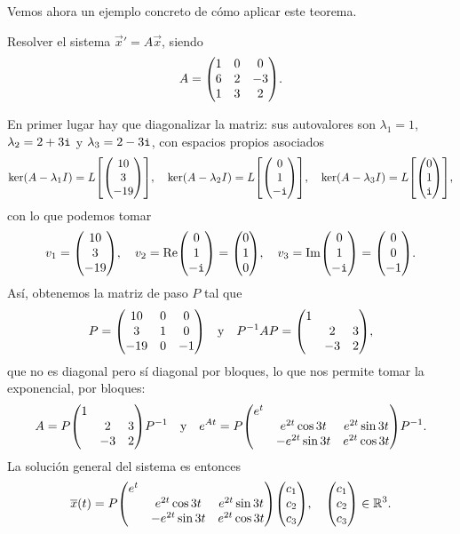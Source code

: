 \documentclass[../ecuaciones_diferenciales.tex]{subfiles}
\begin{document}
Vemos ahora un ejemplo concreto de cómo aplicar este teorema.

\begin{example}
	Resolver el sistema \(\vec{x}' = A\vec{x}\), siendo
	\[A = \mat{1 & 0 & 0 \\ 6 & 2 & -3 \\ 1 & 3 & 2}.\]
\end{example}

\begin{solution}
	En primer lugar hay que diagonalizar la matriz: sus autovalores son
	\(\lambda_1 = 1\), \(\lambda_2 = 2 + 3\mathtt{i}\) y \(\lambda_3 = 2 - 3\mathtt{i}\), 
	con espacios propios asociados
	\[\ker(A - \lambda_1 I) = L \left[ \mat{10 \\ 3 \\ -19} \right], \quad
		\ker(A - \lambda_2 I) = L \left[ \mat{0 \\ 1 \\ -\iu} \right], \quad
		\ker(A - \lambda_3 I) = L \left[\mat{0 \\ 1 \\ \iu} \right],\]
	con lo que podemos tomar
	\[v_1 = \mat{10 \\ 3 \\ -19}, 
		\quad 
		v_2 = \Re\mat{0 \\ 1 \\ -\iu} 
		= \mat{0 \\ 1 \\ 0}, 
		\quad 
		v_3 = \Im\mat{0 \\ 1 \\ -\iu} = \mat{0 \\ 0 \\ -1}.\]
	Así, obtenemos la matriz de paso \(P\) tal que
	\[P = \mat{10 & 0 & 0 \\ 3 & 1 & 0 \\ -19 & 0 & -1}
		\quad \text{y} \quad
		P^{-1}AP = \mat{1 & & \\ & 2 & 3 \\ & -3 & 2},\]
	que no es diagonal pero sí diagonal por bloques, lo que nos permite tomar 
	la exponencial, por bloques:
	\[A = P \mat{1 & & \\ & 2 & 3 \\ & -3 & 2} P^{-1}
		\quad \text{y} \quad
		e^{At} = P \mat{e^t & & \\ & e^{2t} \cos 3t & e^{2t} \sin 3t \\ &
		-e^{2t} \sin 3t & e^{2t} \cos 3t} P^{-1}.\]
	La solución general del sistema es entonces
	\[\vec{x}(t) = P \mat{e^t & & \\ & e^{2t} \cos 3t & e^{2t} \sin 3t \\ &
		-e^{2t} \sin 3t & e^{2t} \cos 3t} \mat{c_1 \\ c_2 \\ c_3}, \quad
		\mat{c_1 \\ c_2 \\ c_3} \in \R^3.\]
\end{solution}
\end{document}
